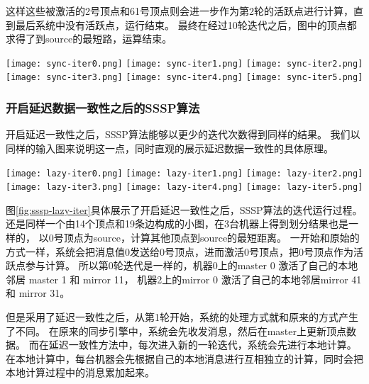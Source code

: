 这样这些被激活的2号顶点和61号顶点则会进一步作为第2轮的活跃点进行计算，直到最后系统中没有活跃点，运行结束。
最终在经过10轮迭代之后，图中的顶点都求得了到source的最短路，运算结束。


\begin{center}
  \texttt{[image: sync-iter0.png]}
  \texttt{[image: sync-iter1.png]}
  \texttt{[image: sync-iter2.png]}    
  \texttt{[image: sync-iter3.png]}    
  \texttt{[image: sync-iter4.png]}    
  \texttt{[image: sync-iter5.png]}    

  \label{fig:sssp-sync-iter}
\end{center}  

\subsubsection{开启延迟数据一致性之后的SSSP算法}

开启延迟一致性之后，SSSP算法能够以更少的迭代次数得到同样的结果。
我们以同样的输入图来说明这一点，同时直观的展示延迟数据一致性的具体原理。

\begin{center}
  \texttt{[image: lazy-iter0.png]}
  \texttt{[image: lazy-iter1.png]}
  \texttt{[image: lazy-iter2.png]}    
  \texttt{[image: lazy-iter3.png]}    
  \texttt{[image: lazy-iter4.png]}    
  \texttt{[image: lazy-iter5.png]}
  \label{fig:sssp-lazy-iter}
\end{center}  


图\ref{fig:sssp-lazy-iter}具体展示了开启延迟一致性之后，SSSP算法的迭代运行过程。
还是同样一个由14个顶点和19条边构成的小图，在3台机器上得到划分结果也是一样的，
以0号顶点为source，计算其他顶点到source的最短距离。
一开始和原始的方式一样，系统会把消息值0发送给0号顶点，进而激活0号顶点，把0号顶点作为活跃点参与计算。  
所以第0轮迭代是一样的，机器0上的master 0 激活了自己的本地邻居 master 1 和 mirror 11，
机器2上的mirror 0 激活了自己的本地邻居mirror 41 和 mirror 31。

但是采用了延迟一致性之后，从第1轮开始，系统的处理方式就和原来的方式产生了不同。
在原来的同步引擎中，系统会先收发消息，然后在master上更新顶点数据。
而在延迟一致性方法中，每次进入新的一轮迭代，系统会先进行本地计算。
在本地计算中，每台机器会先根据自己的本地消息进行互相独立的计算，同时会把本地计算过程中的消息累加起来。

